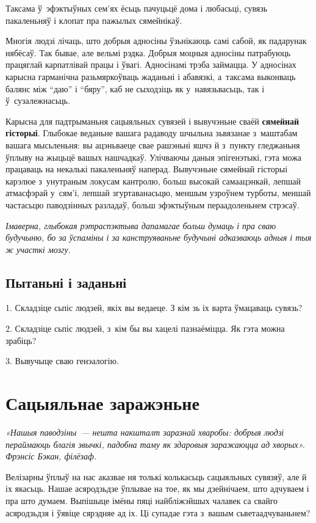 Таксама ў~эфэктыўных сем'ях ёсьць пачуцьцё дома і любасьці, сувязь пакаленьняў і клопат пра пажылых сямейнікаў.

Многія людзі лічаць, што добрыя адносіны ўзьнікаюць самі сабой, як падарунак нябёсаў. Так бывае, але вельмі рэдка. Добрыя моцныя адносіны патрабуюць працяглай карпатлівай працы і ўвагі. Адносінамі трэба займацца. У адносінах карысна гарманічна разьмяркоўваць жаданьні і абавязкі, а~таксама выконваць балянс між ``даю'' і ``бяру'', каб не сыходзіць як у~навязьвасьць, так і ў~сузалежнасьць.

Карысна для падтрыманьня сацыяльных сувязей і вывучэньне сваёй \textbf{сямейнай гісторыі}. Глыбокае веданьне вашага радаводу шчыльна зьвязанае з~маштабам вашага мысьленьня: вы ацэньваеце свае рашэньні яшчэ й з~пункту гледжаньня ўплыву на жыцьцё вашых нашчадкаў. Улічваючы даныя эпігенэтыкі, гэта можа працаваць на некалькі пакаленьняў наперад. Вывучэньне сямейнай гісторыі карэлюе з~унутраным локусам кантролю, больш высокай самаацэнкай, лепшай атмасфэрай у~сям'і, лепшай згуртаванасьцю, меншым узроўнем турботы, меншай частасьцю паводзінных разладаў, больш эфэктыўным пераадоленьнем стрэсаў.

\emph{Імаверна, глыбокая рэтраспэктыва дапамагае больш думаць і пра сваю будучыню, бо за ўспаміны і за канструяваньне будучыні адказваюць адныя і тыя ж участкі мозгу.}

\subsection*{Пытаньні і заданьні}

1. Складзіце сьпіс людзей, якіх вы ведаеце. З кім зь іх варта ўмацаваць сувязь?

2. Складзіце сьпіс людзей, з~кім бы вы хацелі пазнаёміцца. Як гэта можна зрабіць?

3. Вывучыце сваю генэалогію.


\section{Сацыяльнае заражэньне}

\emph{«Нашыя паводзіны~--- нешта накшталт заразнай хваробы: добрыя людзі пераймаюць благія звычкі, падобна таму як здаровыя заражаюцца ад хворых». Фрэнсіс Бэкан, філёзаф.} 

Велізарны ўплыў на нас аказвае ня толькі колькасьць сацыяльных сувязяў, але й іх якасьць. Нашае асяродзьдзе ўплывае на тое, як мы дзейнічаем, што адчуваем і пра што думаем. Выпішыце імёны пяці найбліжэйшых чалавек са свайго асяродзьдзя і ўявіце сярэдняе ад іх. Ці супадае гэта з~вашым сьветаадчуваньнем?

